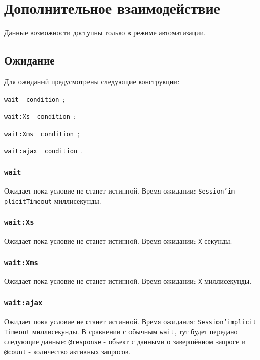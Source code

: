 \section{Дополнительное взаимодействие}

Данные возможности доступны только в режиме автоматизации.

\subsection{Ожидание}

Для ожиданий предусмотрены следующие конструкции:
\begin{icItems}
	\item \texttt{wait { condition }};
	\item \texttt{wait:Xs { condition }};
	\item \texttt{wait:Xms { condition }};
	\item \texttt{wait:ajax { condition }}.
\end{icItems}

\subsubsection{\texttt{wait}}

Ожидает пока условие не станет истинной. Время ожидании: \texttt{Session'im\- plicitTimeout} миллисекунды. 

\subsubsection{\texttt{wait:Xs}}

Ожидает пока условие не станет истинной. Время ожидании: \texttt{X} секунды. 

\subsubsection{\texttt{wait:Xms}}

Ожидает пока условие не станет истинной. Время ожидании: \texttt{X} миллисекунды. 

\subsubsection{\texttt{wait:ajax}}

Ожидает пока условие не станет истинной. Время ожидания: \texttt{Session'implicit\- Timeout} миллисекунды. В сравнении с обычным \texttt{wait}, тут будет передано следующие данные: \texttt{@response} - объект с данными о завершённом запросе и \texttt{@count} - количество активных запросов.

